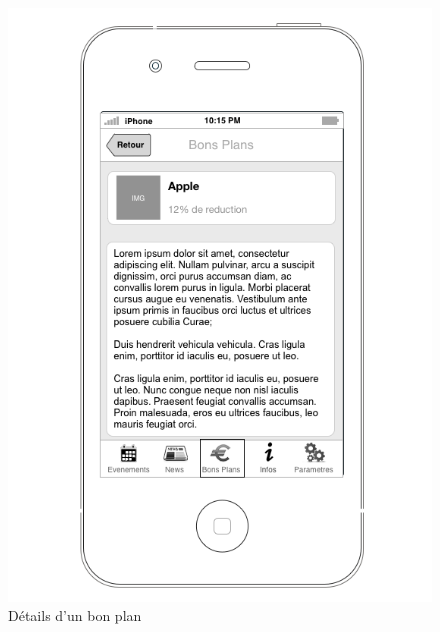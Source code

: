 \documentclass[a4paper, 11pt]{article}
\begin{document}
\begin{figure}[h!]
\begin{minipage}[c]{.50\linewidth}
	\end{minipage}
	\hfill
	\begin{minipage}[c]{.50\linewidth}
		\begin{center}
			\includegraphics[scale=0.29]{../../Sketch/iOS/bons_plans_detail.png}
		\end{center}
	\caption{Détails d'un bon plan}

	\end{minipage}
\end{figure}
\vfill
\clearpage
\end{document}
